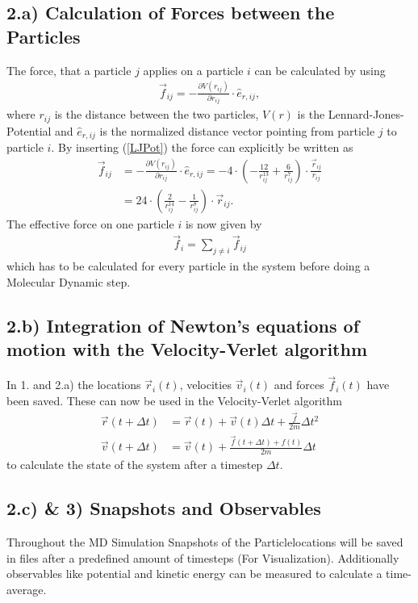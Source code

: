 \subsection*{2.a) Calculation of Forces between the Particles}
The force, that a particle $j$ applies on a particle $i$ can be calculated by using
\begin{align}
	\vec{f}_{ij}=-\frac{\partial V(r_{ij})}{\partial r_{ij}} \cdot \hat{e}_{r,ij},
\end{align}
where $r_{ij}$ is the distance between the two particles, $V(r)$ is the Lennard-Jones-Potential and $\hat{e}_{r,ij}$ is the normalized distance vector pointing from particle $j$ to particle $i$. By inserting (\ref{LJPot}) the force can explicitly be written as
\begin{align}
	\vec{f}_{ij}&=-\frac{\partial V(r_{ij})}{\partial r_{ij}} \cdot \hat{e}_{r,ij} 
	= - 4 \cdot \left(-\frac{12}{r_{ij}^{13}}+ \frac{6}{r_{ij}^7}\right) \cdot \frac{\vec{r}_{ij}}{r_{ij}} \\
	&= 24 \cdot \left(\frac{2}{r_{ij}^{14}} - \frac{1}{r_{ij}^8}\right) \cdot \vec{r}_{ij}.
\end{align}
The effective force on one particle $i$ is now given by 
\begin{align*}
\vec{f}_i = \sum_{j\neq i} \vec{f}_{ij}
\end{align*}
which has to be calculated for every particle in the system before doing a Molecular Dynamic step.

\subsection*{2.b) Integration of Newton's equations of motion with the Velocity-Verlet algorithm}
In 1. and 2.a) the locations $\vec{r}_i(t)$, velocities $\vec{v}_i(t)$ and forces $\vec{f}_i(t)$ have been saved. These can now be used in the Velocity-Verlet algorithm
\begin{align}
\vec{r}(t+\Delta t) &= \vec{r}(t) + \vec{v}(t)\Delta t+\frac{\vec{f}}{2m}\Delta t^2 \\
\vec{v}(t+\Delta t) &= \vec{v}(t) + \frac{\vec{f}(t+\Delta t) + f(t)}{2m}\Delta t
\end{align}
to calculate the state of the system after a timestep $\Delta t$. 

\subsection*{2.c) \& 3) Snapshots and Observables}
Throughout the MD Simulation Snapshots of the Particlelocations will be saved in files after a predefined amount of timesteps (For Visualization). Additionally observables like potential and kinetic energy can be measured to calculate a time-average.
